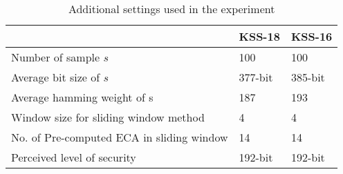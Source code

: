 \renewcommand{\arraystretch}{1.5}{
\begin{table}[ht]
\centering
\caption{ Computational Environment}
\label{table_comenv_twist_chap_ijnc2017}
\end{table}
}

\renewcommand{\arraystretch}{1.3}{
\begin{table}[ht]
	\begin{center}
		\caption{Additional settings used in the experiment}
		\label{table_additional_twist_chap_ijnc2017}
		\begin{tabular}{l|l|l}
			\hline 
			 & KSS-18 & KSS-16 \\ \hline
			 Number of sample $s$& 100 & 100\\ \hline
			 Average bit size  of $s$ & 377-bit & 385-bit\\ \hline
			 Average hamming weight of s & 187 & 193\\ \hline
			 Window size for sliding window method & 4 & 4\\ \hline 
			  No. of Pre-computed ECA in sliding window  & 14 & 14\\ \hline 
			  Perceived level of security & 192-bit & 192-bit\\ \hline
		\end{tabular}
	\end{center}
\end{table}
}
 
